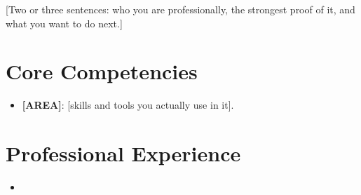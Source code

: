 \documentclass[11pt,a4paper,sans]{moderncv}
\begin{document}
\makecvtitle


\vspace{6pt}
\small{[Two or three sentences: who you are professionally, the strongest proof of it, and what you want to do next.]}


\section{Core Competencies}
\vspace{1pt}
\begin{itemize}

\item \textbf{[AREA]}: [skills and tools you actually use in it].

\end{itemize}


\section{Professional Experience}
\vspace{3pt}
\begin{itemize}

\item{}

\vspace{3pt}

\end{itemize}

\end{document}
